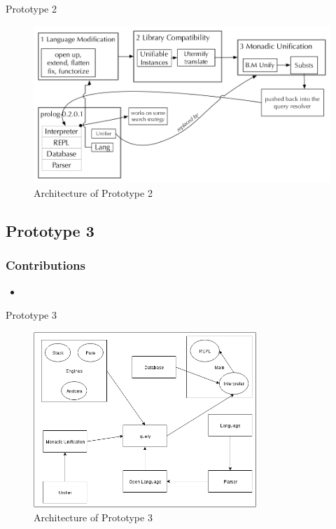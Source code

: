 \documentclass[hideothersubsections]{beamer}
\begin{document}
\begin{frame}{Prototype 2}
\begin{figure}[H]
  \includegraphics[width=1\textwidth]{Prototype-2-architecture.jpeg}
  \caption{Architecture of Prototype 2}
  \label{fig:proto1-arch}
\end{figure}

\end{frame}


\subsection{Prototype 3}

\begin{frame}
\frametitle{Contributions}
\begin{itemize}
\item
\end{itemize}
\end{frame}

\begin{frame}{Prototype 3}
\begin{figure}[H]
  \includegraphics[width=0.75\textwidth]{Prototype-3-architecture.jpeg}
  \caption{Architecture of Prototype 3}
  \label{fig:proto1-arch}
\end{figure}
\end{frame}
\end{document}
